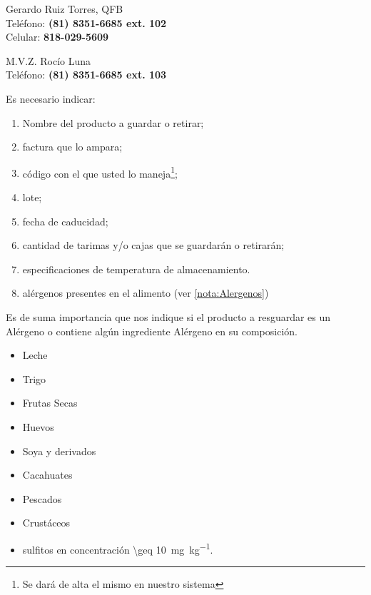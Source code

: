 \begin{contact} \label{contact:Gerente}
	Gerardo Ruiz Torres, QFB\\
	Teléfono: \textbf{(81) 8351-6685 ext. 102}\\
	Celular: \textbf{818-029-5609}\\
\end{contact}

\begin{contact} \label{contact:MedicoTIF}
	M.V.Z. Rocío Luna\\
	Teléfono: \textbf{(81) 8351-6685 ext. 103}\\
\end{contact}

Es necesario indicar:
\begin{enumerate}
	\item Nombre del producto a guardar o retirar;
	\item factura que lo ampara;
	\item código con el que usted lo maneja\footnote{Se dará de alta el mismo en nuestro sistema};
	\item lote;
	\item fecha de caducidad;
	\item cantidad de tarimas y/o cajas que se guardarán o retirarán;
	\item especificaciones de temperatura de almacenamiento.
	\item alérgenos presentes en el \gls{alimento} (ver \cref{nota:Alergenos})
\end{enumerate}

\begin{note} \label{nota:Alergenos}
	Es de suma importancia que nos indique si el producto a resguardar es un Alérgeno o contiene algún ingrediente Alérgeno en su composición.
	\begin{itemize}
		\item Leche
		\item Trigo
		\item Frutas Secas
		\item Huevos
		\item Soya y derivados
		\item Cacahuates
		\item Pescados
		\item Crustáceos
		\item sulfitos en concentración \qty{\geq 10}{\milli\gram\per\kilo\gram}.
	\end{itemize}
\end{note}

